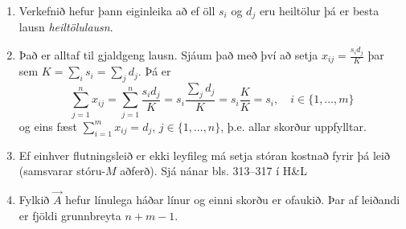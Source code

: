 \begin{aths}\hspace{.1cm}
\begin{enumerate}
\item Verkefnið hefur þann eiginleika að ef öll $s_i$ og $d_j$ eru heiltölur þá er besta lausn \emph{heiltölulausn}.
\item Það er alltaf til gjaldgeng lausn. Sjáum það með því að setja $x_{ij}=\frac{s_id_j}{K}$ þar sem $K=\sum_{i}s_i=\sum_{j}d_j$. Þá er 
$$ \sum_{j=1}^n x_{ij} = \sum_{j=1}^n \frac{s_id_j}{K}=s_i\frac{\sum_j d_j}{K}=s_i\frac{K}{K}=s_i, \quad i\in\{1,...,m\}$$
og eins fæst $\sum_{i=1}^m x_{ij}=d_j$, $j\in\{1,...,n\}$, þ.e. allar skorður uppfylltar.
\newpage
{}
\item Ef einhver flutningsleið er ekki leyfileg má setja stóran kostnað fyrir þá leið (samsvarar stóru-$M$ aðferð). Sjá nánar bls. 313--317 í H\&L
\item Fylkið $\vec{A}$ hefur línulega háðar línur og einni skorðu er ofaukið. Þar af leiðandi er fjöldi grunnbreyta $n+m-1$.
\end{enumerate} 
\end{aths}

